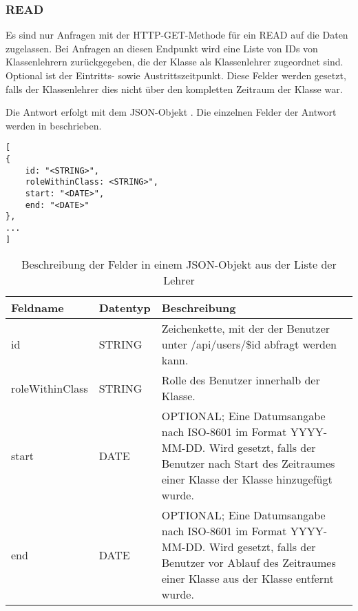 \subsubsection{READ}
\label{sec:rest:api:classes:id:users:read}
Es sind nur Anfragen mit der HTTP-GET-Methode für ein READ auf die Daten zugelassen.
Bei Anfragen an diesen Endpunkt wird eine Liste von IDs von Klassenlehrern zurückgegeben, die der Klasse als Klassenlehrer zugeordnet sind.
Optional ist der Eintritts- sowie Austrittszeitpunkt. Diese Felder werden gesetzt, falls der Klassenlehrer dies nicht über den kompletten Zeitraum der Klasse war.

Die Antwort erfolgt mit dem JSON-Objekt . 
Die einzelnen Felder der Antwort werden in  beschrieben.

\begin{lstlisting}[caption={JSON-Antwort für einen GET-Aufruf des Pfads /api/classes/\$id/users},label={lst:code:rest:api:classes:id:users:read:ret},frame=tlrb]
[
{
    id: "<STRING>",
    roleWithinClass: <STRING>",
    start: "<DATE>",
    end: "<DATE>"    
},
...
]
\end{lstlisting}

\begin{longtable}{|p{}|p{}|p{}|}
		\caption{Beschreibung der Felder in einem JSON-Objekt aus der Liste der Lehrer}
\endfoot
		\caption{Beschreibung der Felder in einem JSON-Objekt aus der Liste der Lehrer}
		\label{tab:rest:api:classes:id:users:read:ret}
\endlastfoot 
\hline
			\textbf{Feldname} & \textbf{Datentyp} & \textbf{Beschreibung} \\ \hline
\endhead
id & STRING & Zeichenkette, mit der der Benutzer unter /api/users/\$id abfragt werden kann. \\ \hline
roleWithinClass & STRING & Rolle des Benutzer innerhalb der Klasse. \\ \hline
start & DATE & OPTIONAL; Eine Datumsangabe nach ISO-8601 im Format YYYY-MM-DD. Wird gesetzt, falls der Benutzer nach Start des Zeitraumes einer Klasse der Klasse hinzugefügt wurde. \\ \hline
end & DATE & OPTIONAL; Eine Datumsangabe nach ISO-8601 im Format YYYY-MM-DD. Wird gesetzt, falls der Benutzer vor Ablauf des Zeitraumes einer Klasse aus der Klasse entfernt wurde. \\ \hline
\end{longtable}
